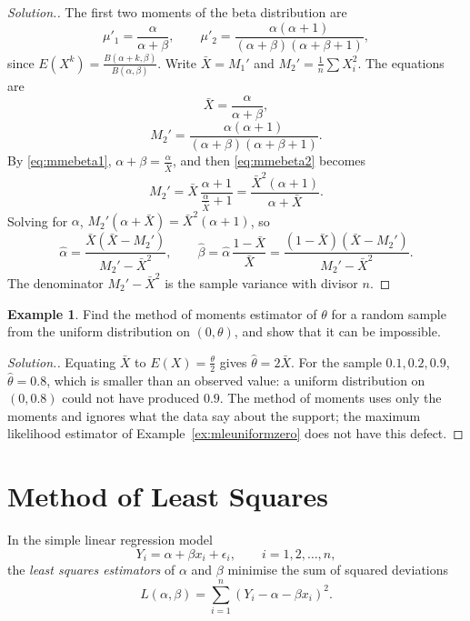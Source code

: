 \documentclass[12pt,a4paper]{report}
\theoremstyle{definition}
\newtheorem{example}[thm]{Example}
\theoremstyle{plain}
\newenvironment{solution}
  {\renewcommand{\qedsymbol}{}\begin{proof}[\textit{Solution}.]}
  {\end{proof}}
\begin{document}
\begin{solution}
The first two moments of the beta distribution are
\[\mu'_1 = \frac{\alpha}{\alpha + \beta},\qquad \mu'_2 = \frac{\alpha(\alpha +
1)}{(\alpha + \beta)(\alpha + \beta + 1)} ,\]
since $E(X^k) = \frac{B(\alpha + k,\beta)}{B(\alpha,\beta)}$. Write
$\bar X = M_1'$ and $M_2' = \frac1n\sum X_i^2$. The equations are
\begin{equation}
\bar X = \frac{\alpha}{\alpha + \beta} ,
\label{eq:mmebeta1}
\end{equation}
\begin{equation}
M_2' = \frac{\alpha(\alpha + 1)}{(\alpha + \beta)(\alpha + \beta + 1)} .
\label{eq:mmebeta2}
\end{equation}
By \eqref{eq:mmebeta1}, $\alpha + \beta = \frac{\alpha}{\bar X}$, and then
\eqref{eq:mmebeta2} becomes
\[M_2' = \bar X\,\frac{\alpha + 1}{\frac{\alpha}{\bar X} + 1} = \frac{\bar
X^2(\alpha + 1)}{\alpha + \bar X} .\]
Solving for $\alpha$, $M_2'(\alpha + \bar X) = \bar X^2(\alpha + 1)$, so
\[\hat\alpha = \frac{\bar X\left(\bar X - M_2'\right)}{M_2' - \bar X^2},\qquad
\hat\beta = \hat\alpha\,\frac{1 - \bar X}{\bar X} = \frac{(1 - \bar X)\left(\bar
X - M_2'\right)}{M_2' - \bar X^2} .\]
The denominator $M_2' - \bar X^2$ is the sample variance with divisor $n$.
\end{solution}

\begin{example}
\label{ex:mmeuniform}
Find the method of moments estimator of $\theta$ for a random sample from the
uniform distribution on $(0,\theta)$, and show that it can be impossible.
\end{example}

\begin{solution}
Equating $\bar X$ to $E(X) = \frac{\theta}{2}$ gives $\hat\theta = 2\bar X$. For
the sample $0.1, 0.2, 0.9$, $\hat\theta = 0.8$, which is smaller than an observed
value: a uniform distribution on $(0,0.8)$ could not have produced $0.9$. The
method of moments uses only the moments and ignores what the data say about the
support; the maximum likelihood estimator of Example~\ref{ex:mleuniformzero}
does not have this defect.
\end{solution}

\section{Method of Least Squares}

In the simple linear regression model
\[Y_i = \alpha + \beta x_i + \epsilon_i ,\qquad i = 1,2,\dots,n,\]
the \emph{least squares estimators} of $\alpha$ and $\beta$ minimise the sum of
squared deviations
\[L(\alpha,\beta) = \sum^n_{i=1}\left(Y_i - \alpha - \beta x_i\right)^2 .\]
\end{document}
